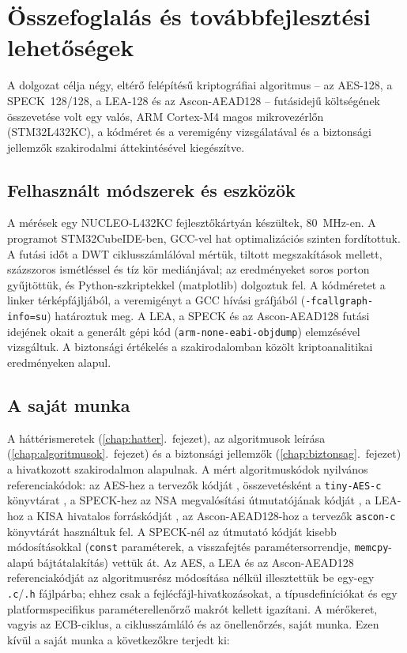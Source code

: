 \documentclass[a4paper,12pt]{report}
\theoremstyle{definition}
\theoremstyle{remark}
\begin{document}
\chapter{Összefoglalás és továbbfejlesztési lehetőségek}\label{chap:osszefoglalas}

A dolgozat célja négy, eltérő felépítésű kriptográfiai algoritmus -- az AES-128, a SPECK~128/128, a LEA-128 és az Ascon-AEAD128 -- futásidejű költségének összevetése volt egy valós, ARM Cortex-M4 magos mikrovezérlőn (STM32L432KC), a kódméret és a veremigény vizsgálatával és a biztonsági jellemzők szakirodalmi áttekintésével kiegészítve.

\section{Felhasznált módszerek és eszközök}

A mérések egy NUCLEO-L432KC fejlesztőkártyán készültek, 80~MHz-en. A programot STM32CubeIDE-ben, GCC-vel hat optimalizációs szinten fordítottuk. A futási időt a DWT ciklusszámlálóval mértük, tiltott megszakítások mellett, százszoros ismétléssel és tíz kör mediánjával; az eredményeket soros porton gyűjtöttük, és Python-szkriptekkel (matplotlib) dolgoztuk fel. A kódméretet a linker térképfájljából, a veremigényt a GCC hívási gráfjából (\texttt{-fcallgraph-info=su}) határoztuk meg. A LEA, a SPECK és az Ascon-AEAD128 futási idejének okait a generált gépi kód (\texttt{arm-none-eabi-objdump}) elemzésével vizsgáltuk. A biztonsági értékelés a szakirodalomban közölt kriptoanalitikai eredményeken alapul.

\section{A saját munka}

A háttérismeretek (\ref{chap:hatter}.~fejezet), az algoritmusok leírása (\ref{chap:algoritmusok}.~fejezet) és a biztonsági jellemzők (\ref{chap:biztonsag}.~fejezet) a hivatkozott szakirodalmon alapulnak. A mért algoritmuskódok nyilvános referenciakódok: az AES-hez a tervezők kódját \cite{RijndaelFst}, összevetésként a \texttt{tiny-AES-c} könyvtárat \cite{TinyAES}, a SPECK-hez az NSA megvalósítási útmutatójának kódját \cite{Beaulieu2019}, a LEA-hoz a KISA hivatalos forráskódját \cite{KISALEAsrc}, az Ascon-AEAD128-hoz a tervezők \texttt{ascon-c} könyvtárát \cite{AsconC} használtuk fel. A SPECK-nél az útmutató kódját kisebb módosításokkal (\texttt{const} paraméterek, a visszafejtés paramétersorrendje, \texttt{memcpy}-alapú bájtátalakítás) vettük át. Az AES, a LEA és az Ascon-AEAD128 referenciakódját az algoritmusrész módosítása nélkül illesztettük be egy-egy \texttt{.c}/\texttt{.h} fájlpárba; ehhez csak a fejlécfájl-hivatkozásokat, a típusdefiníciókat és egy platformspecifikus paraméterellenőrző makrót kellett igazítani. A mérőkeret, vagyis az ECB-ciklus, a ciklusszámláló és az önellenőrzés, saját munka. Ezen kívül a saját munka a következőkre terjedt ki:
\end{document}
